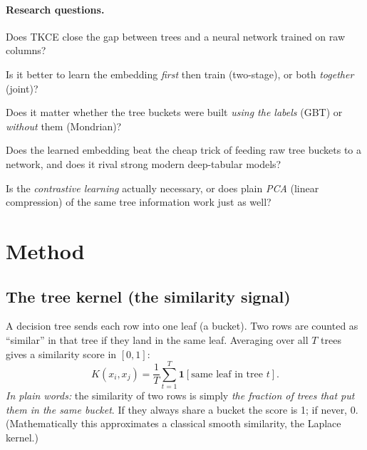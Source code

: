 \documentclass[11pt]{article}
\newcommand{\ind}{\mathbf{1}}
\newcommand{\K}{K}
\begin{document}
\paragraph{Research questions.}
\begin{description}[leftmargin=3.2em,style=nextline]
  \item[RQ1] Does TKCE close the gap between trees and a neural network trained on
  raw columns?
  \item[RQ2] Is it better to learn the embedding \emph{first} then train (two-stage),
  or both \emph{together} (joint)?
  \item[RQ3] Does it matter whether the tree buckets were built \emph{using the
  labels} (GBT) or \emph{without} them (Mondrian)?
  \item[RQ4] Does the learned embedding beat the cheap trick of feeding raw tree
  buckets to a network, and does it rival strong modern deep-tabular models?
  \item[RQ5] Is the \emph{contrastive learning} actually necessary, or does plain
  \emph{PCA} (linear compression) of the same tree information work just as well?
\end{description}

\section{Method}
\subsection{The tree kernel (the similarity signal)}
A decision tree sends each row into one leaf (a bucket). Two rows are counted as
``similar'' in that tree if they land in the same leaf. Averaging over all $T$
trees gives a similarity score in $[0,1]$:
\begin{equation}
\K(x_i,x_j)=\frac{1}{T}\sum_{t=1}^{T}\ind[\text{same leaf in tree }t].
\end{equation}
\textit{In plain words:} the similarity of two rows is simply \emph{the fraction
of trees that put them in the same bucket}. If they always share a bucket the
score is 1; if never, 0. (Mathematically this approximates a classical smooth
similarity, the Laplace kernel.)
\end{document}
